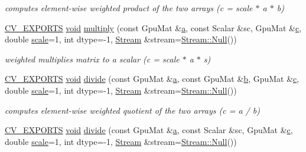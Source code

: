 \begin{DoxyCompactItemize}
\begin{DoxyCompactList}\small\item\em computes element-\/wise weighted product of the two arrays (c = scale $\ast$ a $\ast$ b) \end{DoxyCompactList}\item 
\hyperlink{core_2types__c_8h_a1bf9f0e121b54272da02379cfccd0a2b}{C\-V\-\_\-\-E\-X\-P\-O\-R\-T\-S} \hyperlink{legacy_8hpp_a8bb47f092d473522721002c86c13b94e}{void} \hyperlink{namespacecv_1_1gpu_aa4ab9530e70d7c406d06b6500d372206}{multiply} (const Gpu\-Mat \&\hyperlink{legacy_8hpp_a1031d0e0a97a340abfe0a6ab9e831045}{a}, const Scalar \&sc, Gpu\-Mat \&\hyperlink{legacy_8hpp_a1971420173e06f45845eed2ab4e3d5d0}{c}, double \hyperlink{objdetect_8hpp_a1f622eb9b9e06b30862ca90cdf2c078b}{scale}=1, int dtype=-\/1, \hyperlink{classcv_1_1gpu_1_1Stream}{Stream} \&stream=\hyperlink{classcv_1_1gpu_1_1Stream_af96c23564834f88333dcb8997df553f1}{Stream\-::\-Null}())
\begin{DoxyCompactList}\small\item\em weighted multiplies matrix to a scalar (c = scale $\ast$ a $\ast$ s) \end{DoxyCompactList}\item 
\hyperlink{core_2types__c_8h_a1bf9f0e121b54272da02379cfccd0a2b}{C\-V\-\_\-\-E\-X\-P\-O\-R\-T\-S} \hyperlink{legacy_8hpp_a8bb47f092d473522721002c86c13b94e}{void} \hyperlink{namespacecv_1_1gpu_af5993fa1fd1d9652771f98c5588cdeed}{divide} (const Gpu\-Mat \&\hyperlink{legacy_8hpp_a1031d0e0a97a340abfe0a6ab9e831045}{a}, const Gpu\-Mat \&\hyperlink{legacy_8hpp_ac04272e8ca865b8fba18d36edae9fd2a}{b}, Gpu\-Mat \&\hyperlink{legacy_8hpp_a1971420173e06f45845eed2ab4e3d5d0}{c}, double \hyperlink{objdetect_8hpp_a1f622eb9b9e06b30862ca90cdf2c078b}{scale}=1, int dtype=-\/1, \hyperlink{classcv_1_1gpu_1_1Stream}{Stream} \&stream=\hyperlink{classcv_1_1gpu_1_1Stream_af96c23564834f88333dcb8997df553f1}{Stream\-::\-Null}())
\begin{DoxyCompactList}\small\item\em computes element-\/wise weighted quotient of the two arrays (c = a / b) \end{DoxyCompactList}\item 
\hyperlink{core_2types__c_8h_a1bf9f0e121b54272da02379cfccd0a2b}{C\-V\-\_\-\-E\-X\-P\-O\-R\-T\-S} \hyperlink{legacy_8hpp_a8bb47f092d473522721002c86c13b94e}{void} \hyperlink{namespacecv_1_1gpu_a0b120bad87e24472e77ac26a12503ee5}{divide} (const Gpu\-Mat \&\hyperlink{legacy_8hpp_a1031d0e0a97a340abfe0a6ab9e831045}{a}, const Scalar \&sc, Gpu\-Mat \&\hyperlink{legacy_8hpp_a1971420173e06f45845eed2ab4e3d5d0}{c}, double \hyperlink{objdetect_8hpp_a1f622eb9b9e06b30862ca90cdf2c078b}{scale}=1, int dtype=-\/1, \hyperlink{classcv_1_1gpu_1_1Stream}{Stream} \&stream=\hyperlink{classcv_1_1gpu_1_1Stream_af96c23564834f88333dcb8997df553f1}{Stream\-::\-Null}())

\end{DoxyCompactItemize}
